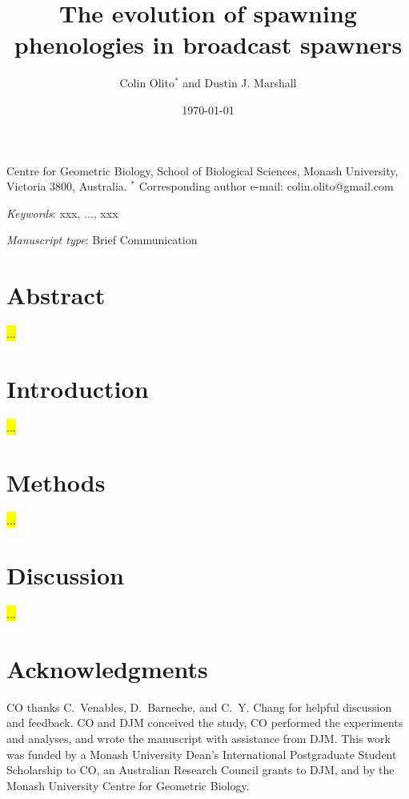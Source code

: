 \documentclass[11pt]{article}
\title{The evolution of spawning phenologies in broadcast spawners}
\author{Colin Olito$^{\ast}$ and Dustin J. Marshall}
\date{\today}
\begin{document}
\maketitle


\noindent{} Centre for Geometric Biology, School of Biological Sciences, Monash University, Victoria 3800, Australia.
\noindent{} $^\ast$ Corresponding author e-mail: colin.olito@gmail.com

\bigskip

\noindent{} \textit{Keywords}: xxx, ..., xxx

\bigskip

\noindent{} \textit{Manuscript type}: Brief Communication

\bigskip

\linenumbers
\modulolinenumbers[1]
\renewcommand\linenumberfont{\normalfont\small}


\newpage{}
\section*{Abstract}

\noindent{} \hl{...}

\section*{Introduction}

\hl{...}


\section*{Methods}

\hl{...}


\section*{Discussion}

\hl{...}



\section*{Acknowledgments}
CO thanks C.~Venables, D.~Barneche, and C.~Y. Chang for helpful discussion and feedback. CO and DJM conceived the study, CO performed the experiments and analyses, and wrote the manuscript with assistance from DJM. This work was funded by a Monash University Dean's International Postgraduate Student Scholarship to CO, an Australian Research Council grants to DJM, and by the Monash University Centre for Geometric Biology.
\end{document}
